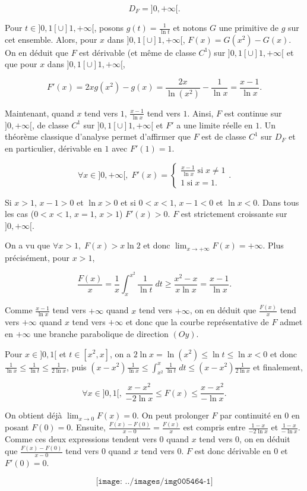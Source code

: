 {{$$D_F=]0,+\infty[.$$

Pour $t\in]0,1[\cup]1,+\infty[$, posons $g(t)=\frac{1}{\ln t}$ et notons $G$ une primitive de $g$ sur cet ensemble. Alors, pour $x$ dans $]0,1[\cup]1,+\infty[$, $F(x)=G(x^2)-G(x)$. On en déduit que $F$ est dérivable (et même de classe $C^1$) sur $]0,1[\cup]1,+\infty[$ et que pour $x$ dans $]0,1[\cup]1,+\infty[$,

$$F'(x)=2xg(x^2)-g(x)=\frac{2x}{\ln(x^2)}-\frac{1}{\ln x}=\frac{x-1}{\ln x}.$$

Maintenant, quand $x$ tend vers $1$, $\frac{x-1}{\ln x}$ tend vers $1$. Ainsi, $F$ est continue sur $]0,+\infty[$, de classe $C^1$ sur $]0,1[\cup]1,+\infty[$ et $F'$ a une limite réelle en $1$. Un théorème classique d'analyse permet d'affirmer que  $F$ est de classe $C^1$ sur $D_F$ et en particulier, dérivable en $1$ avec $F'(1)=1$.

$$\forall x\in]0,+\infty[,\;F'(x)=\left\{
\begin{array}{l}
\frac{x-1}{\ln x}\;\mbox{si}\;x\neq1\\
1\;\mbox{si}\;x=1.
\end{array}
\right..$$

Si $x>1$, $x-1>0$ et $\ln x>0$ et si $0<x<1$, $x-1<0$ et $\ln x<0$. Dans tous les cas ($0<x<1$, $x=1$, $x>1$)  $F'(x)>0$. $F$ est strictement croissante sur $]0,+\infty[$.

On a vu que $\forall x>1,\;F(x)>x\ln2$ et donc $\lim_{x\rightarrow +\infty}F(x)=+\infty$. Plus précisément, pour $x>1$,

$$\frac{F(x)}{x}=\frac{1}{x}\int_{x}^{x^2}\frac{1}{\ln t}\;dt\geq\frac{x^2-x}{x\ln x}=\frac{x-1}{\ln x}.$$

Comme $\frac{x-1}{\ln x}$ tend vers $+\infty$ quand $x$ tend vers $+\infty$, on en déduit que $\frac{F(x)}{x}$ tend vers $+\infty$ quand $x$ tend vers $+\infty$ et donc que la courbe représentative de $F$ admet en $+\infty$ une branche parabolique de direction $(Oy)$.

Pour $x\in]0,1[$ et $t\in[x^2,x]$, on a $2\ln x=\ln(x^2)\leq\ln t\leq\ln x<0$ et donc $\frac{1}{\ln x}\leq\frac{1}{\ln t}\leq\frac{1}{2\ln x}$, puis $(x-x^2)\frac{1}{\ln x}\leq\int_{x^2}^{x}\frac{1}{\ln t}\;dt\leq(x-x^2)\frac{1}{2\ln x}$ et finalement,

$$\forall x\in]0,1[,\;\frac{x-x^2}{-2\ln x}\leq F(x)\leq\frac{x-x^2}{-\ln x}.$$

On obtient déjà $\lim_{x\rightarrow 0}F(x)=0$. On peut prolonger $F$ par continuité en $0$ en posant $F(0)=0$. Ensuite, $\frac{F(x)-F(0)}{x-0}=\frac{F(x)}{x}$ est compris entre $\frac{1-x}{-2\ln x}$ et $\frac{1-x}{-\ln x}$. Comme ces deux expressions tendent vers $0$ quand $x$ tend vers $0$, on en déduit que $\frac{F(x)-F(0)}{x-0}$ tend vers $0$ quand $x$ tend vers $0$. $F$ est donc dérivable en $0$ et $F'(0)=0$.

$$\texttt{[image: ../images/img005464-1]}$$
}
}
